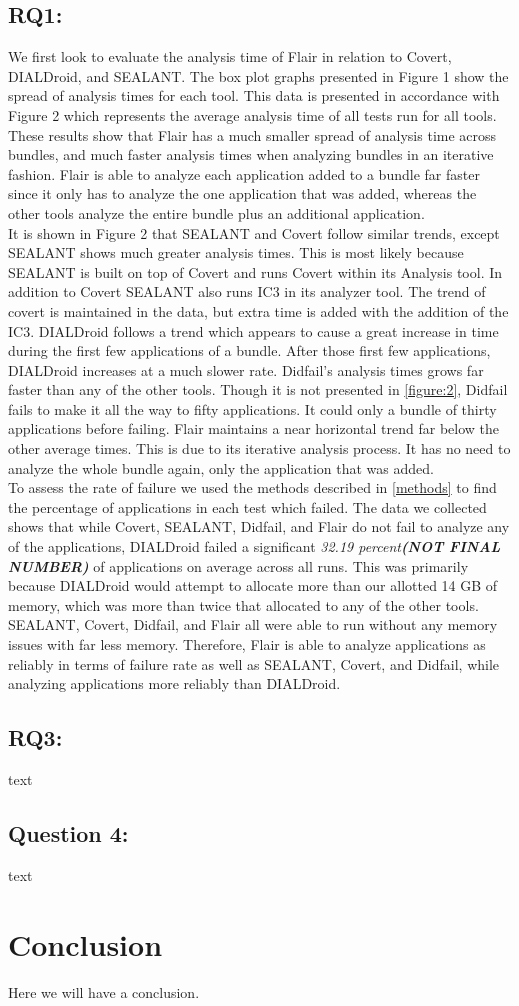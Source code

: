 \documentclass[twocolumn]{article}
\begin{document}
	\subsection{RQ1:}
		We first look to evaluate the analysis time of Flair in relation to Covert, DIALDroid, and SEALANT. The box plot graphs presented in Figure 1 show the spread of analysis times for each tool. This data is presented in accordance with Figure 2 which represents the average analysis time of all tests run for all tools. These results show that Flair has a much smaller spread of analysis time across bundles, and much faster analysis times when analyzing bundles in an iterative fashion. Flair is able to analyze each application added to a bundle far faster since it only has to analyze the one application that was added, whereas the other tools analyze the entire bundle plus an additional application.\\
		It is shown in Figure 2 that SEALANT and Covert follow similar trends, except SEALANT shows much greater analysis times. This is most likely because SEALANT is built on top of Covert and runs Covert within its Analysis tool. In addition to Covert SEALANT also runs IC3 in its analyzer tool. The trend of covert is maintained in the data, but extra time is added with the addition of the IC3. DIALDroid follows a trend which appears to cause a great increase in time during the first few applications of a bundle. After those first few applications, DIALDroid increases at a much slower rate. Didfail's analysis times grows far faster than any of the other tools. Though it is not presented in \ref{figure:2}, Didfail fails to make it all the way to fifty applications. It could only a bundle of thirty applications before failing. Flair maintains a near horizontal trend far below the other average times. This is due to its iterative analysis process. It has no need to analyze the whole bundle again, only the application that was added.\\
		
		To assess the rate of failure we used the methods described in \ref{methods} to find the percentage of applications in each test which failed. The data we collected shows that while Covert, SEALANT, Didfail, and Flair do not fail to analyze any of the applications, DIALDroid failed a significant \textit{32.19 percent\textbf{(NOT FINAL NUMBER)}} of applications on average across all runs. This was primarily because DIALDroid would attempt to allocate more than our allotted 14 GB of memory, which was more than twice that allocated to any of the other tools. SEALANT, Covert, Didfail, and Flair all were able to run without any memory issues with far less memory. Therefore, Flair is able to analyze applications as reliably in terms of failure rate as well as SEALANT, Covert, and Didfail, while analyzing applications more reliably than DIALDroid.
		
	\subsection{RQ3:}
		text
	\subsection{Question 4:}
		text


\section[3]{Conclusion}
Here we will have a conclusion.
\end{document}
